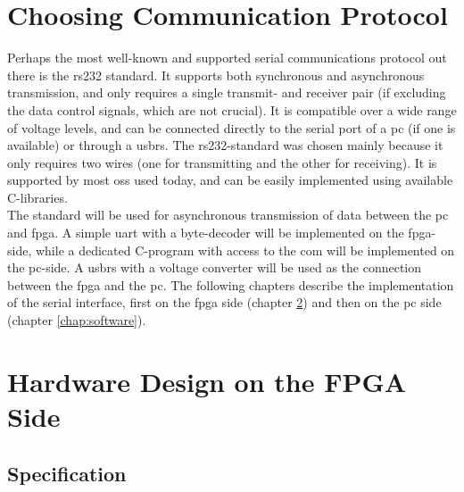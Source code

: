 \documentclass[main.tex]{subfiles}
\begin{document}
\section{Choosing Communication Protocol}
Perhaps the most well-known and supported serial communications protocol out there is the \acrshort{rs232} standard. It supports both synchronous and asynchronous transmission, and only requires a single transmit- and receiver pair (if excluding the data control signals, which are not crucial). It is compatible over a wide range of voltage levels, and can be connected directly to the serial port of a \acrshort{pc} (if one is available) or through a \gls{usbrs}. The \acrshort{rs232}-standard was chosen mainly because it only requires two wires (one for transmitting and the other for receiving). It is supported by most \glspl{os} used today, and can be easily implemented using available C-libraries.\\

The standard will be used for asynchronous transmission of data between the \acrshort{pc} and \gls{fpga}. A simple \gls{uart} with a byte-decoder will be implemented on the \gls{fpga}-side, while a dedicated C-program with access to the \gls{com} will be implemented on the \acrshort{pc}-side. A \gls{usbrs} with a voltage converter will be used as the connection between the \gls{fpga} and the \acrshort{pc}. The following chapters describe the implementation of the serial interface, first on the \gls{fpga} side (chapter \ref{chap:hardware}) and then on the \acrshort{pc} side (chapter \ref{chap:software}).



\section{Hardware Design on the FPGA Side} \label{chap:hardware}

\subsection{Specification}
\end{document}
